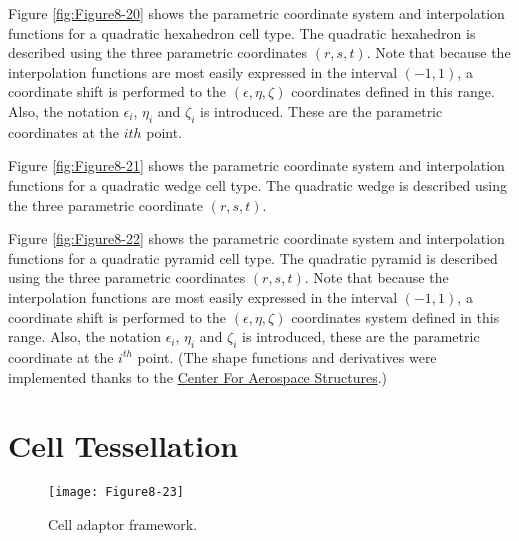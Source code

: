 \begin{description}[leftmargin=0cm,labelindent=0cm]
    \item[Quadratic Hexahedron.\index{interpolation function!quadratic hexahedron}] Figure \ref{fig:Figure8-20} shows the parametric coordinate system and interpolation functions for a quadratic hexahedron cell type. The quadratic hexahedron is described using the three parametric coordinates $(r,s,t)$. Note that because the interpolation functions are most easily expressed in the interval $(-1,1)$, a coordinate shift is performed to the $(\epsilon, \eta, \zeta)$ coordinates defined in this range. Also, the notation $\epsilon_i$, $\eta_i$ and $\zeta_i$ is introduced. These are the parametric coordinates at the $i{th}$ point.

    \item[Quadratic Wedge.\index{interpolation function!quadratic wedge}] Figure \ref{fig:Figure8-21} shows the parametric coordinate system and interpolation functions for a quadratic wedge cell type. The quadratic wedge is described using the three parametric coordinate $(r,s,t)$.

    \item[Quadratic Pyramid.\index{interpolation function!quadratic pyramid}] Figure \ref{fig:Figure8-22} shows the parametric coordinate system and interpolation functions for a quadratic pyramid cell type. The quadratic pyramid is described using the three parametric coordinates $(r,s,t)$. Note that because the interpolation functions are most easily expressed in the interval $(-1,1)$, a coordinate shift is performed to the $(\epsilon, \eta, \zeta)$ coordinates system defined in this range. Also, the notation $\epsilon_i$, $\eta_i$ and $\zeta_i$ is introduced, these are the parametric coordinate at the $i^{th}$ point. (The shape functions and derivatives were implemented thanks to the \href{https://www.colorado.edu/aerospacestructures/}{Center For Aerospace Structures}.)  
 
\end{description}

\section{Cell Tessellation}

\begin{wrapfigure}{R}{0.4\textwidth}
	\centering
	\texttt{[image: Figure8-23]}
	\caption{Cell adaptor framework.}
	\label{fig:Figure8-23}
\end{wrapfigure}

